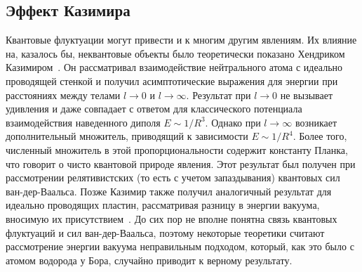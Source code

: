 \subsection{Эффект Казимира}

Квантовые флуктуации могут привести и к многим другим явлениям. Их влияние на, казалось бы, неквантовые объекты было теоретически показано Хендриком Казимиром~\cite{Casimir.van-der-Waals}. 
Он рассматривал взаимодействие нейтрального атома с идеально проводящей стенкой и получил асимптотические выражения для энергии при расстояниях между телами $l\to0$ и $l\to\infty$. 
Результат при $l\to0$ не вызывает удивления и даже совпадает с ответом для классического потенциала взаимодействия наведенного диполя $E \sim 1/R^3$. 
Однако при $l\to\infty$ возникает дополнительный множитель, приводящий к зависимости $E \sim 1/R^4$. 
Более того, численный множитель в этой пропорциональности содержит константу Планка, что говорит о чисто квантовой природе явления. 
Этот результат был получен при рассмотрении релятивистских (то есть с учетом запаздывания) квантовых сил ван-дер-Ваальса. 
Позже Казимир также получил аналогичный результат для идеально проводящих пластин, рассматривая разницу в энергии вакуума, вносимую их присутствием~\cite{Casimir.vacuum}. 
До сих пор не вполне понятна связь квантовых флуктуаций и сил ван-дер-Ваальса, поэтому некоторые теоретики считают рассмотрение энергии вакуума неправильным подходом, который, как это было с атомом водорода у Бора, случайно приводит к верному результату. 


